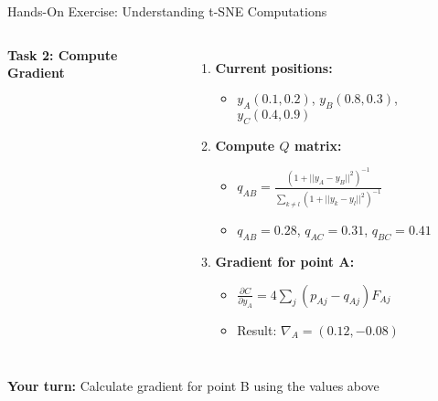 \documentclass[aspectratio=169]{beamer}
\begin{document}
\begin{frame}{Hands-On Exercise: Understanding t-SNE Computations}
\begin{columns}
\textbf{Task 2: Compute Gradient}
\begin{enumerate}
\footnotesize
\item \textbf{Current positions:}
    \begin{itemize}
    \footnotesize
    \item $y_A(0.1, 0.2)$, $y_B(0.8, 0.3)$, $y_C(0.4, 0.9)$
    \end{itemize}
\item \textbf{Compute $Q$ matrix:}
    \begin{itemize}
    \footnotesize
    \item $q_{AB} = \frac{(1+||y_A-y_B||^2)^{-1}}{\sum_{k\neq l}(1+||y_k-y_l||^2)^{-1}}$
    \item $q_{AB} = 0.28$, $q_{AC} = 0.31$, $q_{BC} = 0.41$
    \end{itemize}
\item \textbf{Gradient for point A:}
    \begin{itemize}
    \footnotesize
    \item $\frac{\partial C}{\partial y_A} = 4\sum_j(p_{Aj} - q_{Aj})F_{Aj}$
    \item Result: $\nabla_A = (0.12, -0.08)$
    \end{itemize}
\end{enumerate}
\end{columns}

\vspace{0.3cm}
\centering
\colorbox{yellow!20}{\textbf{Your turn:} Calculate gradient for point B using the values above}

\end{frame}
\end{document}
